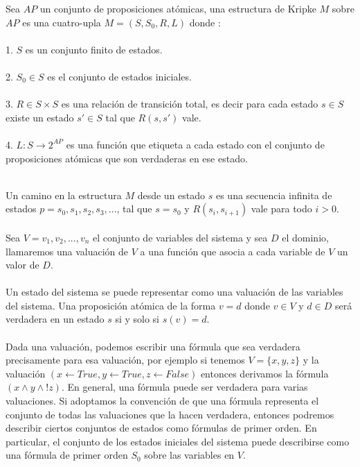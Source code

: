 \begin{definition}
Sea $AP$ un conjunto de proposiciones atómicas, una estructura de Kripke $M$ sobre $AP$ es una cuatro-upla $M = (S, S_{0}, R, L)$ donde \cite{Clarke:1}: \\
\\
1. $S$ es un conjunto finito de estados.\\
\\
2. $S_{0} \in S$ es el conjunto de estados iniciales.\\
\\
3. $R \in S \times S$ es una relación de transición total, es decir para cada estado $s \in S$ existe un estado $s' \in S$ tal que $R(s,s')$ vale.\\
\\
4. $L \colon S \to 2^{AP}$ es una función que etiqueta a cada estado con el conjunto de proposiciones atómicas que son verdaderas en ese estado.\\
\\
\end{definition}
\noindent Un camino en la estructura $M$ desde un estado $s$ es una secuencia infinita de estados $p = s_{0}, s_{1}, s_{2}, s_{3}, ...$, tal que $s = s_{0}$ y $R(s_{i},s_{i+1})$ vale para todo $i>0$.\\
\\
Sea $V = {v_{1}, v_{2}, ..., v_{n}}$ el conjunto de variables del sistema y sea $D$ el dominio, llamaremos una valuación de $V$ a una función que asocia a cada variable de $V$ un valor de $D$.\\
\\
Un estado del sistema se puede representar como una valuación de las variables del sistema. Una proposición atómica de la forma $v = d$ donde $v \in V$ y $d \in D$ será verdadera en un estado $s$ si y solo si $s(v) = d$.\\
\\
Dada una valuación, podemos escribir una fórmula que sea verdadera precisamente para esa valuación, por ejemplo si tenemos $V = \{x,y,z\}$ y la valuación $(x \gets True, y \gets True, z \gets False)$ entonces derivamos la fórmula $(x \land y \land !z)$. En general, una fórmula puede ser verdadera para varias valuaciones. Si adoptamos la convención de que una fórmula representa el conjunto de todas las valuaciones que la hacen verdadera, entonces podremos describir ciertos conjuntos de estados como fórmulas de primer orden. En particular, el conjunto de los estados iniciales del sistema puede describirse como una fórmula de primer orden $S_{0}$ sobre las variables en $V$.\\
